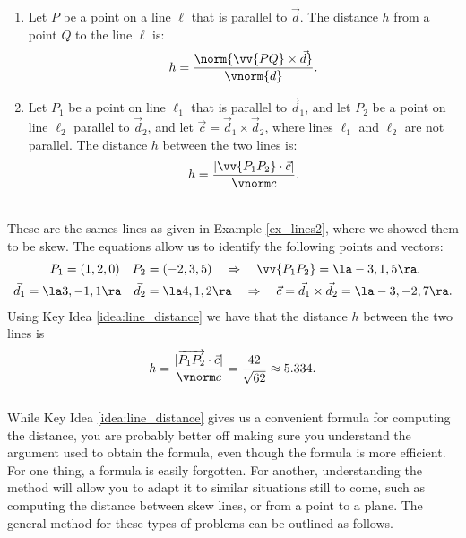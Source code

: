 {\begin{enumerate}
	\item Let $P$ be a point on a line $\ell$ that is parallel to $\vec d$. The distance $h$ from a point $Q$ to the line $\ell$ is:
	\[
	h =\frac{\norm{\vv{PQ}\times \vec d}}{\vnorm{d}}.
	\]
	\item	Let $P_1$ be a point on line $\ell_1$ that is parallel to $\vec d_1$, and let $P_2$ be a point on line $\ell_2$ parallel to $\vec d_2$, and let $\vec c = \vec d_1\times \vec d_2$, where lines $\ell_1$ and $\ell_2$ are not parallel. The distance $h$ between the two lines is:
	\[
	h=\frac{\lvert\vv{P_1P_2}\cdot \vec c\rvert}{\vnorm c}.
	\]
\end{enumerate}
}\\



{These are the sames lines as given in Example \ref{ex_lines2}, where we showed them to be skew. The equations allow us to identify the following points and vectors:
\begin{align*}
P_1 = (1,2,0)\quad P_2 &= (-2,3,5) \quad \Rightarrow \quad \vv{P_1P_2} = \la -3,1,5\ra.\\
\vec d_1 = \la 3,-1,1\ra \quad \vec d_2 &= \la 4,1,2\ra \quad \Rightarrow \quad \vec c = \vec d_1\times \vec d_2 = \la -3,-2,7\ra.
\end{align*}
Using Key Idea \ref{idea:line_distance} we have that the distance $h$ between the two lines is
\[
h = \frac{|\overrightarrow{P_1P_2}\cdot \vec c|}{\vnorm c}=\frac{42}{\sqrt{62}}\approx 5.334.
\]
}\\


While Key Idea \ref{idea:line_distance} gives us a convenient formula for computing the distance, you are probably better off making sure you understand the argument used to obtain the formula, even though the formula is more efficient. For one thing, a formula is easily forgotten. For another, understanding the method will allow you to adapt it to similar situations still to come, such as computing the distance between skew lines, or from a point to a plane. The general method for these types of problems can be outlined as follows.

